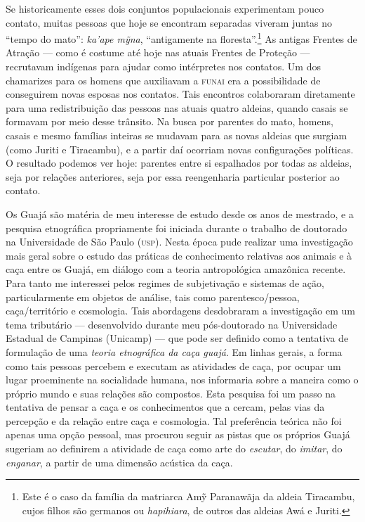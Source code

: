 Se historicamente esses dois conjuntos
populacionais experimentam pouco contato, muitas pessoas que hoje se
encontram separadas viveram juntas no ``tempo do mato'': \textit{ka'ape
mỹna}, ``antigamente na floresta''.\footnote{Este é o caso da família da
  matriarca Amỹ Paranawãja da aldeia Tiracambu, cujos filhos são
  germanos ou \textit{hapihiara}, de outros das aldeias Awá e Juriti.} As
antigas Frentes de Atração --- como é costume até hoje nas atuais Frentes
de Proteção --- recrutavam indígenas para ajudar como intérpretes nos
contatos. Um dos chamarizes para os homens que auxiliavam a \textsc{funai} era a
possibilidade de conseguirem novas esposas nos contatos. Tais encontros
colaboraram diretamente para uma redistribuição das pessoas nas atuais
quatro aldeias, quando casais se formavam por meio desse trânsito. Na
busca por parentes do mato, homens, casais e mesmo famílias inteiras se
mudavam para as novas aldeias que surgiam (como Juriti e Tiracambu), e a
partir daí ocorriam novas configurações políticas. O resultado podemos
ver hoje: parentes entre si espalhados por todas as aldeias, seja por
relações anteriores, seja por essa reengenharia particular posterior ao
contato.


Os Guajá são matéria de meu interesse de estudo desde os anos de
mestrado, e a pesquisa etnográfica propriamente foi iniciada durante o
trabalho de doutorado na Universidade de São Paulo (\textsc{usp}). Nesta época
pude realizar uma investigação mais geral sobre o estudo das práticas de
conhecimento relativas aos animais e à caça entre os Guajá, em diálogo
com a teoria antropológica amazônica recente. Para tanto me interessei
pelos regimes de subjetivação e sistemas de ação, particularmente em
objetos de análise, tais como parentesco/pessoa, caça/território e
cosmologia. Tais abordagens desdobraram a investigação em um tema
tributário --- desenvolvido durante meu pós-doutorado na Universidade
Estadual de Campinas (Unicamp) --- que pode ser definido como a tentativa
de formulação de uma \textit{teoria etnográfica da caça guajá}. Em linhas
gerais, a forma como tais pessoas percebem e executam as atividades de
caça, por ocupar um lugar proeminente na socialidade humana, nos
informaria sobre a maneira como o próprio mundo e suas relações são
compostos. Esta pesquisa foi um passo na tentativa de pensar a caça e os
conhecimentos que a cercam, pelas vias da percepção e da relação entre
caça e cosmologia. Tal preferência teórica não foi apenas uma opção
pessoal, mas procurou seguir as pistas que os próprios Guajá sugeriam ao
definirem a atividade de caça como arte do \textit{escutar}, do \textit{imitar}, do
\textit{enganar}, a partir de uma dimensão acústica da caça.

